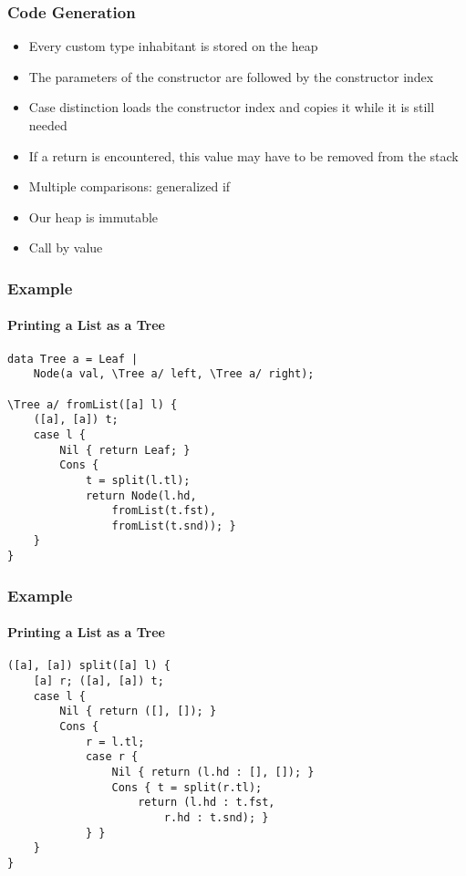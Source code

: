 \documentclass[12pt]{beamer}
\begin{document}
\begin{frame}
    \frametitle{Code Generation}
    \begin{itemize}
        \item Every custom type inhabitant is stored on the heap
        \item The parameters of the constructor are followed by the constructor index
    \end{itemize}
    \begin{itemize}
        \item Case distinction loads the constructor index and copies it while it is still needed
        \item If a return is encountered, this value may have to be removed from the stack
        \item Multiple comparisons: generalized if
    \end{itemize}
    \begin{itemize}
        \item Our heap is immutable
        \item Call by value
    \end{itemize}
\end{frame}

\begin{frame}[fragile]
    \frametitle{Example}
    \framesubtitle{Printing a List as a Tree}
    \begin{verbatim}
data Tree a = Leaf |
    Node(a val, \Tree a/ left, \Tree a/ right);

\Tree a/ fromList([a] l) {
    ([a], [a]) t;
    case l {
        Nil { return Leaf; }
        Cons {
            t = split(l.tl);
            return Node(l.hd,
                fromList(t.fst),
                fromList(t.snd)); }
    }
}\end{verbatim}
\end{frame}

\begin{frame}[fragile]
    \frametitle{Example}
    \framesubtitle{Printing a List as a Tree}
    \begin{verbatim}
([a], [a]) split([a] l) {
    [a] r; ([a], [a]) t;
    case l {
        Nil { return ([], []); }
        Cons {
            r = l.tl;
            case r {
                Nil { return (l.hd : [], []); }
                Cons { t = split(r.tl);
                    return (l.hd : t.fst,
                        r.hd : t.snd); }
            } }
    }
}\end{verbatim}
\end{frame}
\end{document}
